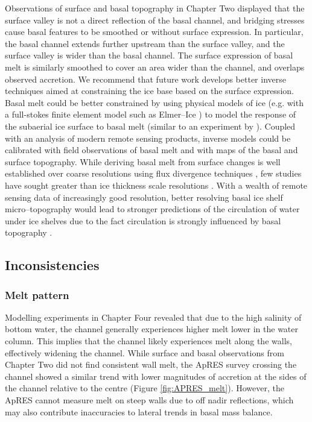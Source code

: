 Observations of surface and basal topography in Chapter Two displayed that the surface valley is not a direct reflection of the basal channel, and bridging stresses cause basal features to be smoothed or without surface expression. In particular, the basal channel extends further upstream than the surface valley, and the surface valley is wider than the basal channel. The surface expression of basal melt is similarly smoothed to cover an area wider than the channel, and overlaps observed accretion. 
We recommend that future work develops better inverse techniques aimed at constraining the ice base based on the surface expression. Basal melt could be better constrained by using physical models of ice (e.g. with a full-stokes finite element model such as Elmer--Ice \cite{gagliardini2013capabilities}) to model the response of the subaerial ice surface to basal melt (similar to an experiment by \cite{drews2020atmospheric}). Coupled with an analysis of modern remote sensing products, inverse models could be calibrated with field observations of basal melt and with maps of the basal and surface topography.  While deriving basal melt from surface changes is well established over coarse resolutions using flux divergence techniques \citep{berger2017detecting}, few studies have sought greater than ice thickness scale resolutions \citep[e.g.][]{mankoff2012role}. With a wealth of remote sensing data of increasingly good resolution, better resolving basal ice shelf micro--topography would lead to stronger predictions of the circulation of water under ice shelves due to the fact circulation is strongly influenced by basal topography \citep{holland2003ice}. 

\subsection{Inconsistencies}

\subsubsection{Melt pattern}

Modelling experiments in Chapter Four revealed that due to the high salinity of bottom water, the channel generally experiences higher melt lower in the water column. This implies that the channel likely experiences melt along the walls, effectively widening the channel. While surface and basal observations from Chapter Two did not find consistent wall melt, the ApRES survey crossing the channel showed a similar trend with lower magnitudes of accretion at the sides of the channel relative to the centre (Figure \ref{fig:APRES_melt}). However, the ApRES cannot measure melt on steep walls due to off nadir reflections, which may also contribute inaccuracies to lateral trends in basal mass balance.

